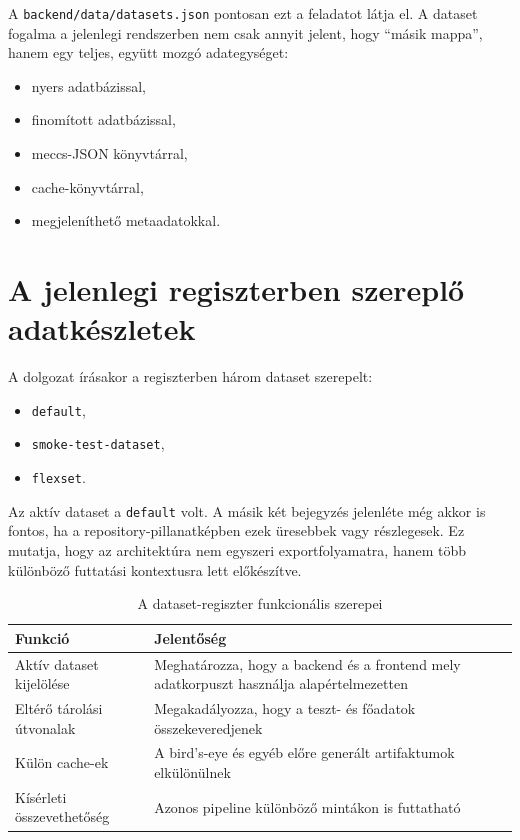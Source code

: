 \documentclass[a4paper,12pt]{report}
\begin{document}
A \texttt{backend/data/datasets.json} pontosan ezt a feladatot látja el. A dataset fogalma a jelenlegi rendszerben nem csak annyit jelent, hogy ``másik mappa'', hanem egy teljes, együtt mozgó adategységet:

\begin{itemize}
    \item nyers adatbázissal,
    \item finomított adatbázissal,
    \item meccs-JSON könyvtárral,
    \item cache-könyvtárral,
    \item megjeleníthető metaadatokkal.
\end{itemize}

\section{A jelenlegi regiszterben szereplő adatkészletek}

A dolgozat írásakor a regiszterben három dataset szerepelt:

\begin{itemize}
    \item \texttt{default},
    \item \texttt{smoke-test-dataset},
    \item \texttt{flexset}.
\end{itemize}

Az aktív dataset a \texttt{default} volt. A másik két bejegyzés jelenléte még akkor is fontos, ha a repository-pillanatképben ezek üresebbek vagy részlegesek. Ez mutatja, hogy az architektúra nem egyszeri exportfolyamatra, hanem több különböző futtatási kontextusra lett előkészítve.

\begin{table}[H]
\centering
\caption{A dataset-regiszter funkcionális szerepei}
\begin{tabularx}{\textwidth}{>{\raggedright\arraybackslash}p{4.2cm}X}
\toprule
\textbf{Funkció} & \textbf{Jelentőség} \\
\midrule
Aktív dataset kijelölése & Meghatározza, hogy a backend és a frontend mely adatkorpuszt használja alapértelmezetten \\
Eltérő tárolási útvonalak & Megakadályozza, hogy a teszt- és főadatok összekeveredjenek \\
Külön cache-ek & A bird's-eye és egyéb előre generált artifaktumok elkülönülnek \\
Kísérleti összevethetőség & Azonos pipeline különböző mintákon is futtatható \\
\bottomrule
\end{tabularx}
\end{table}
\end{document}
